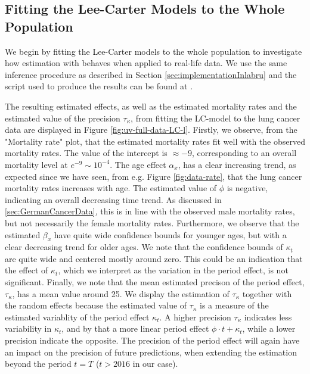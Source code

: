 \subsection{Fitting the Lee-Carter Models to the Whole Population}
\label{sec:LC-full-data}
We begin by fitting the Lee-Carter models to the whole population to investigate how estimation with \inlabru behaves when applied to real-life data. We use the same inference procedure as described in Section \ref{sec:implementationInlabru} and the script used to produce the results can be found at 
.

\newpar The resulting estimated effects, as well as the estimated mortality rates and the estimated value of the precision $\tau_\kappa$, from fitting the LC-model to the lung cancer data are displayed in Figure \ref{fig:uv-full-data-LC-l}. Firstly, we observe, from the "Mortality rate" plot, that the estimated mortality rates fit well with the observed mortality rates. The value of the intercept is $\approx -9$, corresponding to an overall mortality level at $e^{-9} \sim 10^{-4}$. The age effect $\alpha_x$, has a clear increasing trend, as expected since we have seen, from e.g. Figure \ref{fig:data-rate}, that the lung cancer mortality rates increases with age. The estimated value of $\phi$ is negative, indicating an overall decreasing time trend. As discussed in \ref{sec:GermanCancerData}, this is in line with the observed male mortality rates, but not necessarily the female mortality rates. Furthermore, we observe that the estimated $\beta_x$ have quite wide confidence bounds for younger ages, but with a clear decreasing trend for older ages. We note that the confidence bounds of $\kappa_t$ are quite wide and centered mostly around zero. This could be an indication that the effect of $\kappa_t$, which we interpret as the variation in the period effect, is not significant. Finally, we note that the mean estimated precison of the period effect, $\tau_\kappa$, has a mean value around 25. We display the estimation of $\tau_\kappa$ together with the random effects because the estimated value of $\tau_\kappa$ is a measure of the estimated variablity of the period effect $\kappa_t$. A higher precision $\tau_\kappa$ indicates less variability in $\kappa_t$, and by that a more linear period effect $\phi\cdot t + \kappa_t$, while a lower precision indicate the opposite. The precision of the period effect will again have an impact on the precision of future predictions, when extending the estimation beyond the period $t = T$ ($t > 2016$ in our case). 

